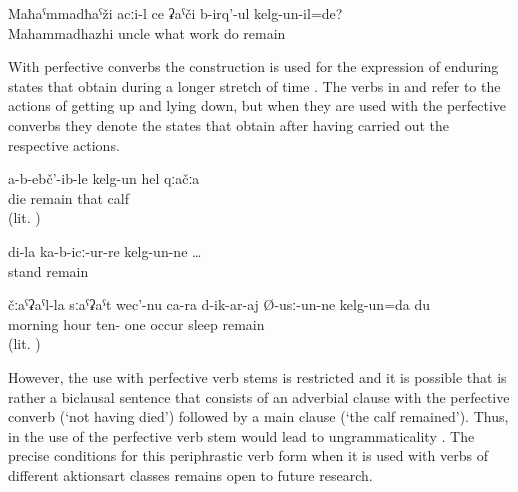 \begin{exe}
	\ex	\label{ex:‎Which work was uncle Mahammadhazhi doing}
	\gll	Maħaˁmmadħaˁži	acːi-l	ce	ʡaˁči	b-irq'-ul	kelg-un-il=de?	\\
		Mahammadhazhi	uncle	what	work	do	remain\\
	\glt	{}
\end{exe}
%
With perfective converbs the construction is used for the expression of enduring states that obtain during a longer stretch of time . The verbs in  and  refer to the actions of getting up and lying down, but when they are used with the perfective converbs they denote the states that obtain after having carried out the respective actions. 
%
\begin{exe}
	\ex	\label{ex:The calf stayed alive periphrastic}
	\gll	a-b-ebč'-ib-le	kelg-un	hel	qːačːa\\
		die	remain	that	calf\\
	\glt	{} (lit. )

	\ex	\label{ex:‎‎‎Mine (i.e. my stick) remained upright standing}
	\gll	di-la	ka-b-icː-ur-re	kelg-un-ne	\ldots\\
			stand	remain\\
	\glt	{}

	\ex	\label{ex:In the morning, I slept until eleven}
	\gll	čːaˁʡaˁl-la	sːaˁʡaˁt	wec'-nu	ca-ra	d-ik-ar-aj	Ø-usː-un-ne	kelg-un=da	du\\
		morning	hour	ten-	one	occur	sleep		remain	\\
	\glt	{} (lit. )
\end{exe}

However, the use with perfective verb stems is restricted and it is possible that  is rather a biclausal sentence that consists of an adverbial clause with the perfective converb (`not having died') followed by a main clause (`the calf remained'). Thus, in  the use of the perfective verb stem would lead to ungrammaticality . The precise conditions for this periphrastic verb form when it is used with verbs of different aktionsart classes  remains open to future research.

